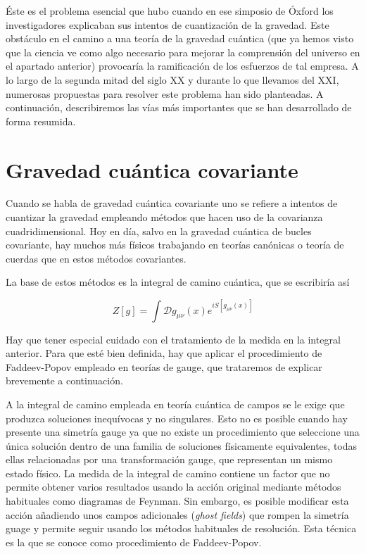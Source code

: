 \documentclass[11pt,a4paper,titlepage]{article}
\begin{document}
Éste es el problema esencial que hubo cuando en ese simposio de Óxford los investigadores explicaban sus intentos de cuantización de la gravedad. Este obstáculo en el camino a una teoría de la gravedad cuántica (que ya hemos visto que la ciencia ve como algo necesario para mejorar la comprensión del universo en el apartado anterior) provocaría la ramificación de los esfuerzos de tal empresa. A lo largo de la segunda mitad del siglo XX y durante lo que llevamos del XXI, numerosas propuestas para resolver este problema han sido planteadas. A continuación, describiremos las vías más importantes que se han desarrollado de forma resumida.
%
%
%
%
\newpage
\section{Gravedad cuántica covariante}

Cuando se habla de gravedad cuántica covariante uno se refiere a intentos de cuantizar la gravedad empleando métodos que hacen uso de la covarianza cuadridimensional. Hoy en día, salvo en la gravedad cuántica de bucles covariante, hay muchos más físicos trabajando en teorías canónicas o teoría de cuerdas que en estos métodos covariantes.

La base de estos métodos es la integral de camino cuántica, que se escribiría así

\begin{equation*}
 Z[g]=\int\mathscr{D}g_{\mu\nu}(x)e^{iS[g_{\mu\nu}(x)]}
\end{equation*}

Hay que tener especial cuidado con el tratamiento de la medida en la integral anterior. Para que esté bien definida, hay que aplicar el procedimiento de Faddeev-Popov \cite{popov} empleado en teorías de gauge, que trataremos de explicar brevemente a continuación.

A la integral de camino empleada en teoría cuántica de campos se le exige que produzca soluciones inequívocas y no singulares. Esto no es posible cuando hay presente una simetría gauge ya que no existe un procedimiento que seleccione una única solución dentro de una familia de soluciones físicamente equivalentes, todas ellas relacionadas por una transformación gauge, que representan un mismo estado físico. La medida de la integral de camino contiene un factor que no permite obtener varios resultados usando la acción original mediante métodos habituales como diagramas de Feynman. Sin embargo, es posible modificar esta acción añadiendo unos campos adicionales (\emph{ghost fields}) que rompen la simetría guage y permite seguir usando los métodos habituales de resolución. Esta técnica es la que se conoce como procedimiento de Faddeev-Popov.
\end{document}
